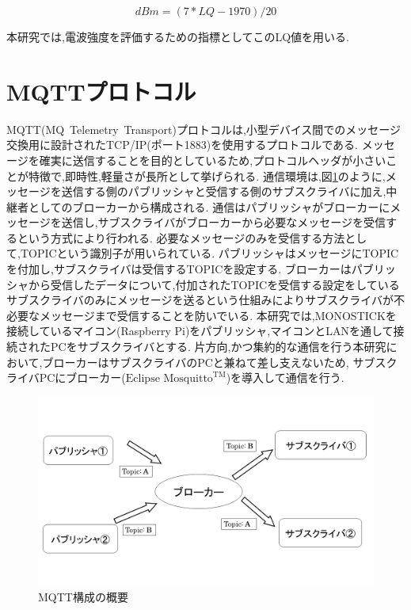 \begin{equation}
  dBm = (7*LQ-1970)/20
\end{equation}

本研究では,電波強度を評価するための指標としてこのLQ値を用いる.



\section{MQTTプロトコル}
MQTT(MQ\ Telemetry\ Transport)プロトコルは,小型デバイス間でのメッセージ交換用に設計されたTCP/IP(ポート1883)を使用するプロトコルである.
メッセージを確実に送信することを目的としているため,プロトコルヘッダが小さいことが特徴で,即時性,軽量さが長所として挙げられる.\cite{MQTT}
通信環境は,図\ref{mqtt}のように,メッセージを送信する側のパブリッシャと受信する側のサブスクライバに加え,中継者としてのブローカーから構成される.
通信はパブリッシャがブローカーにメッセージを送信し,サブスクライバがブローカーから必要なメッセージを受信するという方式により行われる.
必要なメッセージのみを受信する方法として,TOPICという識別子が用いられている.
パブリッシャはメッセージにTOPICを付加し,サブスクライバは受信するTOPICを設定する.
ブローカーはパブリッシャから受信したデータについて,付加されたTOPICを受信する設定をしているサブスクライバのみにメッセージを送るという仕組みによりサブスクライバが不必要なメッセージまで受信することを防いでいる.
本研究では,MONOSTICKを接続しているマイコン(Raspberry Pi)をパブリッシャ,マイコンとLANを通して接続されたPCをサブスクライバとする.
片方向,かつ集約的な通信を行う本研究において,ブローカーはサブスクライバのPCと兼ねて差し支えないため,
サブスクライバPCにブローカー($\text{Eclipse Mosquitto}^\text{TM}$)を導入して通信を行う.

\begin{figure}[!htb]
  \centering
  \includegraphics[width = 12cm, bb= 0 0 900 600]{chapter2/MQTT.png}
  \caption{MQTT構成の概要}
  \label{mqtt}
\end{figure}


